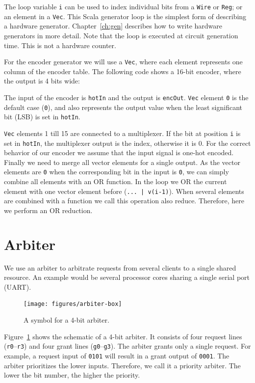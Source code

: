 \documentclass[%
    10pt,
    headinclude, footexclude,
    openright, %
    notitlepage,
    cleardoubleempty,
    headsepline,
    pointlessnumbers,
    bibtotoc, idxtotoc,
    ]{scrbook}
\newcommand{\code}[1]{{\lstinline[basicstyle=\small\ttfamily]{#1}}}
\begin{document}

\noindent The loop variable \code{i} can be used to index individual bits from a \code{Wire} or
\code{Reg}; or an element in a \code{Vec}. This Scala generator loop is the simplest form of describing
a hardware generator. Chapter~\ref{ch:gen} describes how to write hardware generators in more detail.
Note that the loop is executed at circuit generation time. This is not a hardware counter.

For the encoder generator we will use a \code{Vec}, where each element represents one column
of the encoder table. The following code shows a 16-bit encoder, where the output is 4 bits wide:


\noindent The input of the encoder is \code{hotIn} and the output is \code{encOut}.
\code{Vec} element \code{0} is the default case (\code{0}), and also represents the output
value when the least significant bit (LSB) is set in \code{hotIn}.

\code{Vec} elements 1 till 15 are connected to a multiplexer. If the bit at position \code{i}
is set in \code{hotIn}, the multiplexer output is the index, otherwise it is 0. For the correct
behavior of our encoder we assume that the input signal is one-hot encoded.
Finally we need to merge all vector elements for a single output. As the vector elements
are \code{0} when the corresponding bit in the input is \code{0}, we can simply combine
all elements with an OR function. In the loop we OR the current element with one vector
element before (\code{... | v(i-1)}). When several elements are combined with a function
we call this operation also reduce. Therefore, here we perform an OR reduction.

\section{Arbiter}
\label{sec:arbiter}


We use an arbiter to arbitrate requests from several clients to a single shared resource.
An example would be several processor cores sharing a single serial port (UART).

\begin{figure}
  \centering
  \texttt{[image: figures/arbiter-box]}
  \caption{A symbol for a 4-bit arbiter.}
  \label{fig:arbiter-box}
\end{figure}

Figure~\ref{fig:arbiter-box} shows the schematic of a 4-bit arbiter.
It consists of four request lines (\code{r0}--\code{r3}) and four grant lines
(\code{g0}--\code{g3}). The arbiter grants only a single request.
For example, a request input of \code{0101} will result in
a grant output of \code{0001}. The arbiter prioritizes the lower
inputs. Therefore, we call it a priority arbiter. The lower the bit number,
the higher the priority.
\end{document}
